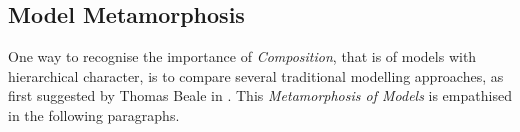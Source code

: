 %
%
%
%
%
%
%

\subsection{Model Metamorphosis}
\label{model_metamorphosis_heading}

One way to recognise the importance of \emph{Composition}, that is of models
with hierarchical character, is to compare several traditional modelling
approaches, as first suggested by Thomas Beale in \cite[p. 11-18]{archetypes}.
This \emph{Metamorphosis of Models} is empathised in the following paragraphs.




